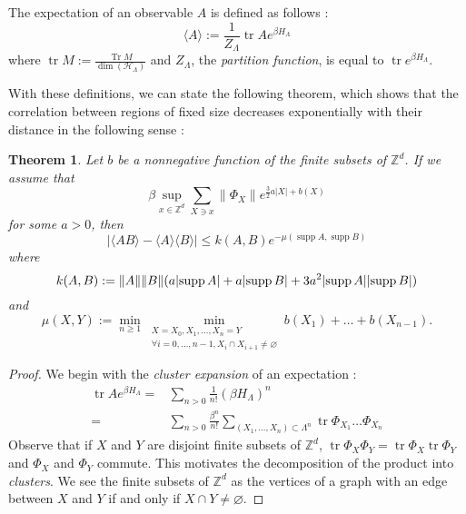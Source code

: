 \documentclass[french]{article}
\DeclarePairedDelimiter\abs{\lvert}{\rvert}
\newtheorem{thm}{Theorem}
\DeclareMathOperator{\Tr}{Tr}
\DeclareMathOperator{\tr}{tr}
\DeclareMathOperator{\supp}{supp}
\begin{document}
 The expectation of an observable $A$ is defined as follows :
 $$
 \langle A \rangle := \frac{1}{Z_\Lambda}\tr Ae^{\beta H_\Lambda}
 $$
 where $\tr M:=\frac{\Tr M}{\dim(\mathcal H_\Lambda)}$ and $Z_\Lambda$, the {\it partition function}, is equal to $\tr e^{\beta H_\Lambda}$.
 
 With these definitions, we can state the following theorem, which shows that the correlation between regions of fixed size decreases exponentially with their distance in the following sense :
 \begin{thm}
     Let $b$ be a nonnegative function of the finite subsets of $\mathbb Z^d$.
     If we assume that 
     $$\beta\sup_{x\in\mathbb Z^d}\sum_{X\ni x}\lVert\Phi_X\rVert e^{\frac{3}{2}a|X|+b(X)}$$ 
     for some $a>0$, then 
     $$|\langle AB\rangle - \langle A\rangle\langle B\rangle|\leq k(A,B)e^{-\mu(\supp A,\supp B)}$$
     where $$k(A,B):=\lVert A\rVert\lVert B\rVert(a\abs{\supp A}+a\abs{\supp B} + 3a^2\abs{\supp A}\abs{\supp B})$$ and 
     $$
     \mu(X,Y):= \min_{n\geq 1} \min_{\substack{X=X_0,X_1,\ldots,X_n=Y \\ \forall i=0,\ldots,n-1, X_i\cap X_{i+1}\neq \varnothing}} b(X_1)+\ldots+b(X_{n-1}).
     $$
 \end{thm}
 \begin{proof}
     We begin with the {\it cluster expansion} of an expectation :
     \begin{align*}
         \tr Ae^{\beta H_\Lambda}=&\sum_{n>0}\frac{1}{n!}(\beta H_\Lambda)^n\\
         =&\sum_{n>0}\frac{\beta^n}{n!}\sum_{(X_1,\ldots, X_n)\subset \Lambda^n}\tr\Phi_{X_1}\ldots\Phi_{X_n}
     \end{align*}
     Observe that if $X$ and $Y$ are disjoint finite subsets of $\mathbb Z^d$, $\tr \Phi_X\Phi_Y=\tr \Phi_X \tr\Phi_Y$ and $\Phi_X$ and $\Phi_Y$ commute.
    This motivates the decomposition of the product into {\it clusters}.
    We see the finite subsets of $\mathbb Z^d$ as the vertices of a graph with an edge between $X$ and $Y$ if and only if $X\cap Y\neq \varnothing$.
     
 \end{proof}
 
 
 
 \printbibliography
\end{document}
